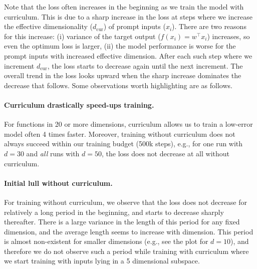 Note that the loss often increases in the beginning as we train the model with curriculum. This is due to a sharp increase in the loss at steps where we increase the effective dimensionality ($d_\text{cur}$) of prompt inputs ($x_i$). There are two reasons for this increase: (i) variance of the target output ($f(x_i) = w^\top x_i$) increases, so even the optimum loss is larger, (ii) the model performance is worse for the prompt inputs with increased effective dimension. After each such step where we increment $d_\text{cur}$, the loss starts to decrease again until the next increment. The overall trend in the loss looks upward when the sharp increase dominates the decrease that follows. Some observations worth highlighting are as follows.

\paragraph{Curriculum drastically speed-ups training.} For functions in 20 or more dimensions, curriculum allows us to train a low-error model often 4 times faster. Moreover, training without curriculum does not always succeed within our training budget (500k steps), e.g., for one run with $d=30$  and \emph{all} runs with $d=50$, the loss does not decrease at all without curriculum.
    
\paragraph{Initial lull without curriculum.}     For training without curriculum, we observe that the loss does not decrease for relatively a long period in the beginning, and starts to decrease sharply thereafter. There is a large variance in the length of this period for any fixed dimension, and  the average length  seems to increase with dimension. This period is almost non-existent for smaller dimensions (e.g., see the plot for $d=10$), and therefore we do not observe such a period while training with curriculum where we start training with inputs lying in a 5 dimensional subspace.




